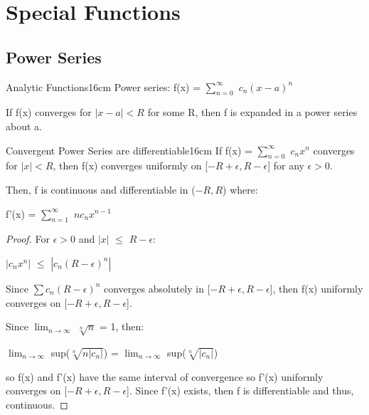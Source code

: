 \newpage

\section[Day 15: Special Functions]{ Special Functions }

\subsection{ Power Series }

    \begin{definition}{Analytic Functions}{16cm}
        Power series: f(x) = $\sum_{n=0}^{\infty}$ $c_n(x-a)^n$

        If f(x) converges for $|x-a| < R$
        for some R, then f is expanded in a power series about a.
    \end{definition}

    \vspace{0.5cm}



    \begin{wtheorem}{Convergent Power Series are differentiable}{16cm}
        If f(x) = $\sum_{n=0}^{\infty}$ $c_nx^n$ converges for $|x| < R$, then
        f(x) converges uniformly on [$-R+\epsilon,R-\epsilon$] for any
        $\epsilon > 0$.

        Then, f is continuous and differentiable in ($-R,R$) where:

        \hspace{0.5cm}
        f'(x) = $\sum_{n=1}^{\infty}$ $nc_nx^{n-1}$
    \end{wtheorem}

    \begin{proof}
        For $\epsilon > 0$ and $|x|$ $\leq$ $R - \epsilon$:

        \hspace{0.5cm}
        $|c_nx^n|$ $\leq$ $|c_n(R-\epsilon)^n|$

        Since $\sum c_n(R-\epsilon)^n$ converges absolutely in
        [$-R+\epsilon,R-\epsilon$], then f(x) uniformly converges on
        [$-R+\epsilon,R-\epsilon$].
        
        Since $\lim_{n \rightarrow \infty}$ $\sqrt[n]{n}$ = 1, then:

        \hspace{0.5cm}
        $\lim_{n \rightarrow \infty}$ sup($\sqrt[n]{n|c_n|}$)
        = $\lim_{n \rightarrow \infty}$ sup($\sqrt[n]{|c_n|}$)
        
        so f(x) and f'(x) have the same interval of convergence
        so f'(x) uniformly converges on [$-R+\epsilon,R-\epsilon$].
        Since f'(x) exists, then f
        is differentiable and thus, continuous. 
    \end{proof}

